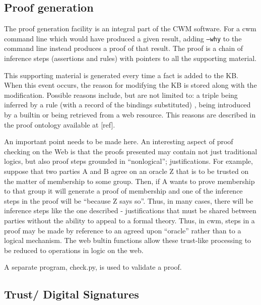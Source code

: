 \documentclass{tlp}
\begin{document}
\subsection{Proof generation}
  

\par The proof generation facility is an integral part of the CWM
software. For a cwm command line which would have produced a given
result, adding {\tt --why} to the command line instead
produces a proof of that result. The proof is a chain of inference
steps (assertions and rules) with pointers to all the supporting
material.

\par This supporting material is generated every time a fact is added
to the KB. When this event occurs, the reason for modifying the KB
is stored along with the modification. Possible reasons include,
but are not limited to: a triple being inferred by a rule (with a
record of the bindings substituted) , being introduced by a builtin
or being retrieved from a web resource. This reasons are described
in the proof ontology available at [ref].

\par An important point needs to be made here. An interesting aspect
of proof checking on the Web is that the proofs presented may
contain not just traditional logics, but also proof steps grounded
in ``nonlogical''; justifications. For example, suppose that two
parties A and B agree on an oracle Z that is to be trusted on the
matter of membership to some group. Then, if A wants to prove
membership to that group it will generate a proof of membership and
one of the inference steps in the proof will be ``because Z says
so''. Thus, in many cases, there will be inference steps like the
one described - justifications that must be shared between parties
without the ability to appeal to a formal theory. Thus, in cwm,
steps in a proof may be made by reference to an agreed upon
``oracle'' rather than to a logical mechanism. The web bultin
functions allow these trust-like processing to be reduced to
operations in logic on the web.

\par A separate program, check.py, is used to validate a proof.
\subsection{Trust/ Digital Signatures}
  
\end{document}
